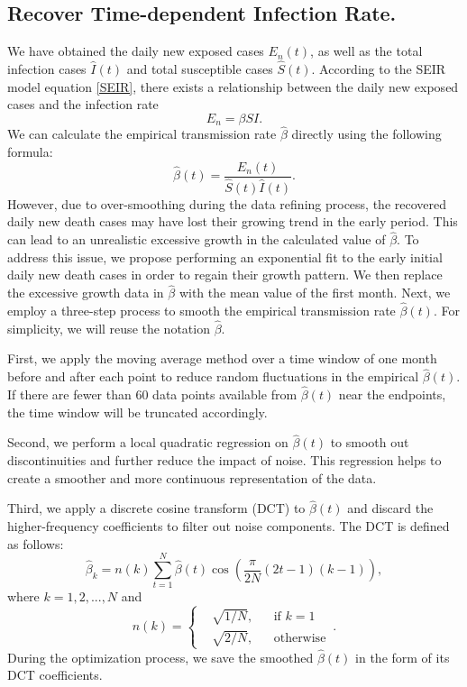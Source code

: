 \documentclass[sn-mathphys,Numbered]{sn-jnl}
\begin{document}
\subsection{Recover Time-dependent Infection Rate.}
We have obtained the daily new exposed cases $E_n(t)$, as well as the total infection cases $\hat{I}(t)$ and total susceptible cases $\hat{S}(t)$. According to the SEIR model equation \eqref{SEIR}, there exists a relationship between the daily new exposed cases and the infection rate
$$
E_n=\beta SI.
$$
We can calculate the empirical transmission rate $\hat{\beta}$ directly using the following formula:
$$
\hat{\beta}(t)=\frac{E_n(t)}{\hat{S}(t)\hat{I}(t)}.
$$
However, due to over-smoothing during the data refining process, the recovered daily new death cases may have lost their growing trend in the early period. This can lead to an unrealistic excessive growth in the calculated value of $\hat{\beta}$. To address this issue, we propose performing an exponential fit to the early initial daily new death cases in order to regain their growth pattern. We then replace the excessive growth data in $\hat{\beta}$ with the mean value of the first month.
Next, we employ a three-step process to smooth the empirical transmission rate $\hat{\beta}(t)$. For simplicity, we will reuse the notation $\hat{\beta}$.

First, we apply the moving average method over a time window of one month before and after each point to reduce random fluctuations in the empirical $\hat{\beta}(t)$. If there are fewer than 60 data points available from $\hat{\beta}(t)$ near the endpoints, the time window will be truncated accordingly.

Second, we perform a local quadratic regression on $\hat{\beta}(t)$ to smooth out discontinuities and further reduce the impact of noise. This regression helps to create a smoother and more continuous representation of the data.

Third, we apply a discrete cosine transform (DCT) to $\hat{\beta}(t)$ and discard the higher-frequency coefficients to filter out noise components. The DCT is defined as follows:
$$
\hat{\beta}_k=n(k)\sum_{t=1}^{N}\hat{\beta}(t)\cos{\left(\frac{\pi}{2N}(2t-1)(k-1)\right)},
$$
where $k=1,2,...,N$ and
$$
n(k)=\left\{\begin{aligned}
    &\sqrt{1/N},&&\text{if }k=1\\
    &\sqrt{2/N},&&\text{otherwise}
\end{aligned}\,.\right.
$$
During the optimization process, we save the smoothed $\hat{\beta}(t)$ in the form of its DCT coefficients.
\end{document}
